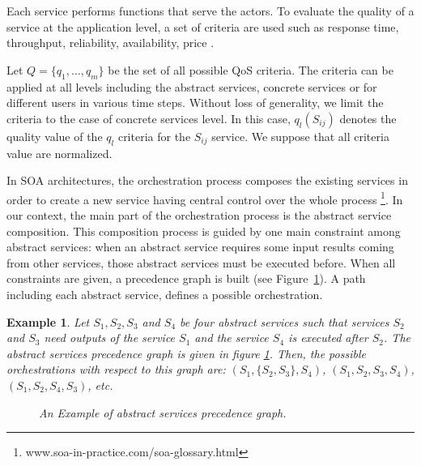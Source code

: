 \documentclass[10pt,journal,compsoc]{IEEEtran}
\newtheorem{example}{Example}
\newcommand{\red}[1]{\textcolor{red}{#1}}
\begin{document}
Each service performs functions that serve the actors. To evaluate the quality of a service at the application level, a set of criteria are used such as response time, throughput, reliability, availability, price \cite{xiong2009web, zeng2004qos}.%

Let $Q=\{q_1,\dots, q_m\}$ be the set of all possible QoS criteria. The criteria can be applied at all levels including the abstract services, concrete services or for different users  in various time steps. Without loss of generality, we limit the criteria to the case of concrete services level. In this case, $q_l(S_{ij})$ denotes the quality value of the $q_l$ criteria for the $S_{ij}$ service. We suppose that all criteria value are normalized. %

In SOA architectures, the orchestration process composes the existing services in order to create a new service having central control over the whole process \footnote{www.soa-in-practice.com/soa-glossary.html}. In our context, the main part of the orchestration process is the abstract service composition. 
This composition process is guided by one main constraint among abstract services: when an abstract service requires some input results coming from other services, those abstract services must be executed before. When all constraints are given, a precedence graph is built (see Figure~\ref{figureOrchestration}). A path including each abstract service, defines a possible orchestration.

\begin{example} 
\label{exemple1}
Let $S_1, S_2, S_3$ and $S_4$ be four abstract services such that services $S_2$ and $S_3$ need outputs of the service $S_1$ and the service $S_4$ is executed after $S_2$. The abstract services precedence graph is given in figure \ref{exemple1}. Then, the possible orchestrations with respect to this graph are: $(S_1,\{S_2,S_3\},S_4)$, $(S_1,S_2,S_3,S_4)$, $(S_1,S_2,S_4,S_3)$, etc.
%
\begin{figure}[htpb]
\label{figureOrchestration}
\centering {}
\caption{ An Example of abstract services precedence graph. }
\end{figure}
\end{example}
\end{document}
